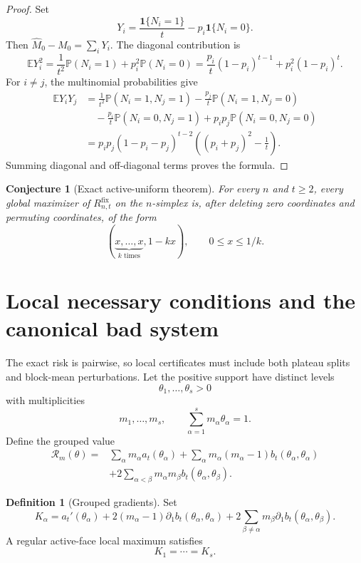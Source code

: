 \documentclass[11pt]{article}
\newtheorem{conjecture}[theorem]{Conjecture}
\theoremstyle{definition}
\newtheorem{definition}[theorem]{Definition}
\newcommand{\E}{\mathbb E}
\newcommand{\Pp}{\mathbb P}
\newcommand{\ones}{\mathbf 1}
\newcommand{\fix}{\mathrm{fix}}
\begin{document}
\begin{proof}
Set
\[
  Y_i=\frac{\ones\{N_i=1\}}{t}-p_i\ones\{N_i=0\}.
\]
Then $\widehat M_0-M_0=\sum_iY_i$.  The diagonal contribution is
\[
  \E Y_i^2
  =\frac1{t^2}\Pp(N_i=1)+p_i^2\Pp(N_i=0)
  =\frac{p_i}{t}(1-p_i)^{t-1}+p_i^2(1-p_i)^t.
\]
For $i\ne j$, the multinomial probabilities give
\begin{align*}
\E Y_iY_j
&=\frac1{t^2}\Pp(N_i=1,N_j=1)
 -\frac{p_j}{t}\Pp(N_i=1,N_j=0) \\
&\quad -\frac{p_i}{t}\Pp(N_i=0,N_j=1)
 +p_ip_j\Pp(N_i=0,N_j=0) \\
&=p_ip_j(1-p_i-p_j)^{t-2}
  \left((p_i+p_j)^2-\frac1t\right).
\end{align*}
Summing diagonal and off-diagonal terms proves the formula.
\end{proof}

\begin{conjecture}[Exact active-uniform theorem]\label{conj:active-uniform}
For every $n$ and $t\ge2$, every global maximizer of $R_{n,t}^{\fix}$ on the $n$-simplex is, after deleting zero coordinates and permuting coordinates, of the form
\[
  (\underbrace{x,\ldots,x}_{k\text{ times}},1-kx),
  \qquad 0\le x\le 1/k.
\]
\end{conjecture}

\section{Local necessary conditions and the canonical bad system}

The exact risk is pairwise, so local certificates must include both plateau splits and block-mean perturbations.  Let the positive support have distinct levels
\[
  \theta_1,\ldots,\theta_s>0
\]
with multiplicities
\[
  m_1,\ldots,m_s,
  \qquad
  \sum_{\alpha=1}^s m_\alpha\theta_\alpha=1.
\]
Define the grouped value
\[
\begin{aligned}
\mathcal R_m(\theta)
={}&\sum_\alpha m_\alpha a_t(\theta_\alpha)
+\sum_\alpha m_\alpha(m_\alpha-1)b_t(\theta_\alpha,\theta_\alpha)\\
&+2\sum_{\alpha<\beta}m_\alpha m_\beta b_t(\theta_\alpha,\theta_\beta).
\end{aligned}
\]

\begin{definition}[Grouped gradients]
Set
\[
  K_\alpha
  =a_t'(\theta_\alpha)
  +2(m_\alpha-1)\partial_1b_t(\theta_\alpha,\theta_\alpha)
  +2\sum_{\beta\ne\alpha}m_\beta\partial_1b_t(\theta_\alpha,\theta_\beta).
\]
A regular active-face local maximum satisfies
\[
  K_1=\cdots=K_s.
\]
\end{definition}
\end{document}
